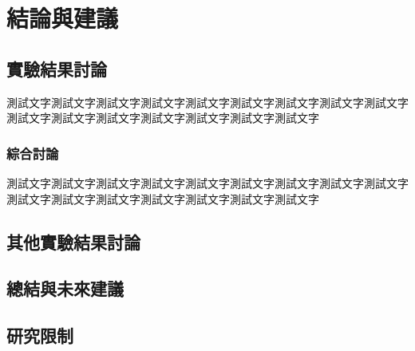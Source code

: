 \chapter{結論與建議}
\label{c:conclusion}
\section{實驗結果討論}

測試文字測試文字測試文字測試文字測試文字測試文字測試文字測試文字測試文字測試文字測試文字測試文字測試文字測試文字測試文字測試文字

\subsection{綜合討論}

測試文字測試文字測試文字測試文字測試文字測試文字測試文字測試文字測試文字測試文字測試文字測試文字測試文字測試文字測試文字測試文字

\section{其他實驗結果討論}

\section{總結與未來建議}

\section{研究限制}
